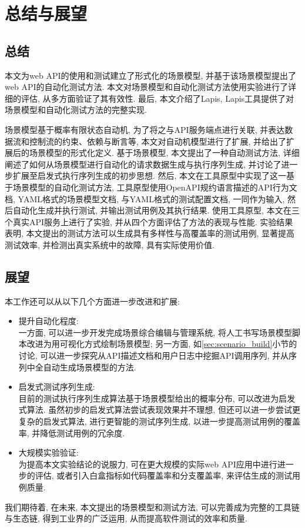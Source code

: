 \chapter{总结与展望}
    
    \section{总结}
        本文为web API的使用和测试建立了形式化的场景模型, 并基于该场景模型提出了web API的自动化测试方法. 本文对场景模型和自动化测试方法使用实验进行了详细的评估, 从多方面验证了其有效性. 最后, 本文介绍了Lapis, Lapis工具提供了对场景模型和自动化测试方法的完整实现.
        
        场景模型基于概率有限状态自动机, 为了将之与API服务端点进行关联, 并表达数据流和控制流的约束、依赖与断言等, 本文对自动机模型进行了扩展, 并给出了扩展后的场景模型的形式化定义. 基于场景模型, 本文提出了一种自动测试方法, 详细阐述了如何从场景模型进行自动化的请求数据生成与执行序列生成, 并讨论了进一步扩展至启发式执行序列生成的初步思想. 然后, 本文在工具原型中实现了这一基于场景模型的自动化测试方法, 工具原型使用OpenAPI规约语言描述的API行为文档, YAML格式的场景模型文档, 与YAML格式的测试配置文档, 一同作为输入, 然后自动化生成并执行测试, 并输出测试用例及其执行结果. 使用工具原型, 本文在三个真实API服务上进行了实验, 并从四个方面评估了方法的表现与性能. 实验结果表明, 本文提出的测试方法可以生成具有多样性与高覆盖率的测试用例, 显著提高测试效率, 并检测出真实系统中的故障, 具有实际使用价值.
    
    \section{展望}
    
        本工作还可以从以下几个方面进一步改进和扩展:
        \begin{itemize}
            \item 提升自动化程度:\\
            一方面, 可以进一步开发完成场景综合编辑与管理系统, 将人工书写场景模型脚本改进为用可视化方式绘制场景模型; 另一方面, 如\ref{sec:scenario_build}小节的讨论, 可以进一步探究从API描述文档和用户日志中挖掘API调用序列, 并从序列中全自动生成场景模型的方法.
            
            \item 启发式测试序列生成:\\
            目前的测试执行序列生成算法基于场景模型给出的概率分布, 可以改进为启发式算法. 虽然初步的启发式算法尝试表现效果并不理想, 但还可以进一步尝试更复杂的启发式算法, 进行更智能的测试序列生成, 以进一步提高测试用例的覆盖率, 并降低测试用例的冗余度.
            
            \item 大规模实验验证:\\
            为提高本文实验结论的说服力, 可在更大规模的实际web API应用中进行进一步的评估, 或者引入白盒指标如代码覆盖率和分支覆盖率, 来评估生成的测试用例质量.
        \end{itemize}
        
        我们期待着, 在未来, 本文提出的场景模型和测试方法, 可以完善成为完整的工具链与生态链, 得到工业界的广泛运用, 从而提高软件测试的效率和质量.
